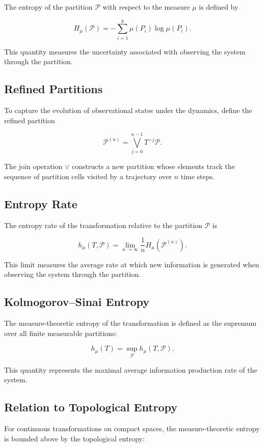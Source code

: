 \documentclass[12pt]{article}
\begin{document}
The entropy of the partition $\mathcal{P}$ with respect to the measure $\mu$ is defined by

\[
H_\mu(\mathcal{P})
=
-
\sum_{i=1}^k
\mu(P_i)\log \mu(P_i).
\]

This quantity measures the uncertainty associated with observing the system through the partition.

\subsection{Refined Partitions}

To capture the evolution of observational states under the dynamics, define the refined partition

\[
\mathcal{P}^{(n)}
=
\bigvee_{j=0}^{n-1} T^{-j}\mathcal{P}.
\]

The join operation $\vee$ constructs a new partition whose elements track the sequence of partition cells visited by a trajectory over $n$ time steps.

\subsection{Entropy Rate}

The entropy rate of the transformation relative to the partition $\mathcal{P}$ is

\[
h_\mu(T,\mathcal{P})
=
\lim_{n\to\infty}
\frac{1}{n}
H_\mu\!\left(\mathcal{P}^{(n)}\right).
\]

This limit measures the average rate at which new information is generated when observing the system through the partition.

\subsection{Kolmogorov--Sinai Entropy}

The measure-theoretic entropy of the transformation is defined as the supremum over all finite measurable partitions:

\[
h_\mu(T)
=
\sup_{\mathcal{P}}
h_\mu(T,\mathcal{P}).
\]

This quantity represents the maximal average information production rate of the system.

\subsection{Relation to Topological Entropy}

For continuous transformations on compact spaces, the measure-theoretic entropy is bounded above by the topological entropy:
\end{document}
